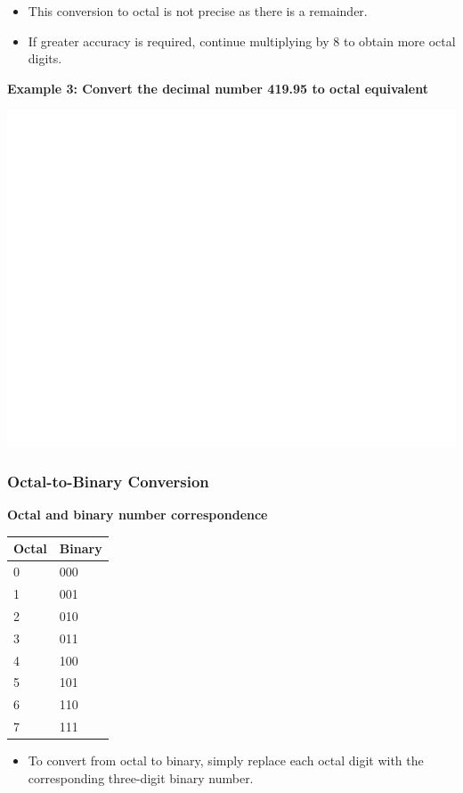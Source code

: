 \documentclass[]{book}
\providecommand{\tightlist}{%
  \setlength{\itemsep}{0pt}\setlength{\parskip}{0pt}}
\begin{document}
\begin{itemize}
\tightlist
\item
  This conversion to octal is not precise as there is a remainder.
\item
  If greater accuracy is required, continue multiplying by 8 to obtain more octal digits.
\end{itemize}

\textbf{Example 3: Convert the decimal number 419.95 to octal equivalent}

\begin{center}\includegraphics[width=1\linewidth]{figure/NSbox12-1} \end{center}

\hypertarget{octal-to-binary-conversion}{%
\subsubsection{Octal-to-Binary Conversion}\label{octal-to-binary-conversion}}

\textbf{Octal and binary number correspondence}

\begin{longtable}[]{@{}ll@{}}
\toprule
Octal & Binary\tabularnewline
\midrule
\endhead
0 & 000\tabularnewline
1 & 001\tabularnewline
2 & 010\tabularnewline
3 & 011\tabularnewline
4 & 100\tabularnewline
5 & 101\tabularnewline
6 & 110\tabularnewline
7 & 111\tabularnewline
\bottomrule
\end{longtable}

\begin{itemize}
\tightlist
\item
  To convert from octal to binary, simply replace each octal digit with the corresponding three-digit binary number.
\end{itemize}
\end{document}
